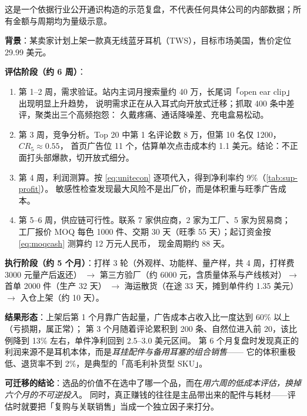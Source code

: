 \begin{casebox}
这是一个依据行业公开通识构造的示范复盘，不代表任何具体公司的内部数据；所有金额与周期均为量级示意。

\textbf{背景}：某卖家计划上架一款真无线蓝牙耳机（TWS），目标市场美国，售价定位 29.99 美元。

\textbf{评估阶段（约 6 周）}：
\begin{enumerate}
  \item 第 1--2 周，需求验证。站内主词月搜索量约 40 万，长尾词「open ear clip」出现明显上升趋势，
        说明需求正在从入耳式向开放式迁移；抓取 400 条中差评，聚类出三个高频抱怨：
        久戴疼痛、通话降噪差、充电盒易松动。
  \item 第 3 周，竞争分析。Top 20 中第 1 名评论数 8 万，但第 10 名仅 1200，$CR_5 \approx 0.55$，
        首页广告位 11 个，估算单次点击成本约 1.1 美元。结论：不正面打头部爆款，切开放式细分。
  \item 第 4 周，利润测算。按 \cref{eq:unitecon} 逐项代入，得到净利率约 9\%（\cref{tab:sup-profit}）。
        敏感性检查发现最大风险不是出厂价，而是体积重与旺季广告成本。
  \item 第 5--6 周，供应链可行性。联系 7 家供应商，2 家为工厂、5 家为贸易商；
        工厂报价 MOQ 每色 1000 件、交期 30 天（旺季 55 天）；起订资金按 \cref{eq:moqcash} 测算约 12 万元人民币，
        现金周期约 88 天。
\end{enumerate}

\textbf{执行阶段（约 5 个月）}：打样 3 轮（外观样、功能样、量产样，共 4 周，打样费 3000 元量产后返还）
$\to$ 第三方验厂（约 6000 元，含质量体系与产线核对）$\to$ 首单 2000 件（生产 32 天）
$\to$ 海运散货（在途 33 天，摊到单件约 1.35 美元）$\to$ 入仓上架（约 10 天）。

\textbf{结果形态}：上架后第 1 个月靠广告起量，广告成本占收入比一度达到 60\% 以上（亏损期，属正常）；
第 3 个月随着评论累积到 200 条、自然位进入前 20，该比例降到 13\% 左右，单件净利回到 2.5--3.0 美元区间。
第 6 个月复盘时发现真正的利润来源不是耳机本体，而是\emph{耳挂配件与备用耳塞的组合销售}——
它的体积重极低、退货率不到 2\%，是典型的「高毛利补货型 SKU」。

\textbf{可迁移的结论}：选品的价值不在选中了哪一个品，而在\emph{用六周的低成本评估，换掉六个月的不可逆投入}。
同时，真正赚钱的往往是主品带出来的配件与耗材——评估时就要把「复购与关联销售」当成一个独立因子来打分。
\end{casebox}

